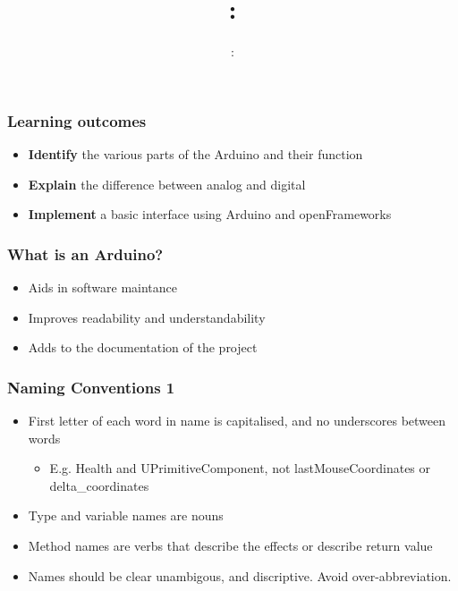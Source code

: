\usepackage{../../beamerthemeFalmouthGamesAcademy}
\usepackage{multimedia}
\graphicspath{ {../../} }


\usepackage[normalem]{ulem}
\usepackage{wasysym}
\usepackage{listings}
\usepackage{pdfpages}

\usetikzlibrary{arrows,automata}




\title{\sessionnumber: }
\subtitle{\modulecode: \moduletitle}

\frame{\titlepage}

\begin{frame}
	\frametitle{Learning outcomes}
	\begin{itemize}
		\item \textbf{Identify} the various parts of the Arduino and their function
		\item \textbf{Explain} the difference between analog and digital
		\item \textbf{Implement} a basic interface using Arduino and openFrameworks
	\end{itemize}
\end{frame}

\begin{frame}
  \frametitle{What is an Arduino?}
  \begin{itemize}
    \item Aids in software maintance
    \item Improves readability and understandability
    \item Adds to the documentation of the project
  \end{itemize}
\end{frame}

\begin{frame}
  \frametitle{Naming Conventions 1}
  \begin{itemize}
    \item First letter of each word in name is capitalised, and no underscores between words
    \begin{itemize}
      \item E.g. Health and UPrimitiveComponent, not lastMouseCoordinates or delta\_coordinates
    \end{itemize}
    \item Type and variable names are nouns
    \item Method names are verbs that describe the effects or describe return value
    \item Names should be clear unambigous, and discriptive. Avoid over-abbreviation.
  \end{itemize}
\end{frame}

